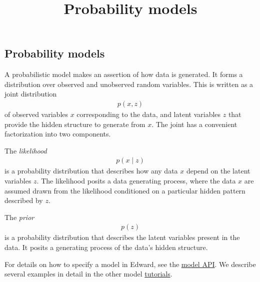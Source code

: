 \title{Probability models}

\subsection{Probability models}

A probabilistic model makes an assertion of how data is generated.
It forms a distribution over observed and unobserved random variables.
This is written as a joint distribution
\begin{align*}
  p(x, z)
\end{align*}
of observed variables $x$ corresponding to the data, and latent
variables $z$ that provide the hidden structure to generate from $x$.
The joint has a convenient factorization into two components.

The \emph{likelihood}
\begin{align*}
  p(x \mid z)
\end{align*}
is a probability distribution that describes how any data $x$ depend
on the latent variables $z$. The likelihood posits a data generating
process, where the data $x$ are assumed drawn from the likelihood
conditioned on a particular hidden pattern described by $z$.

The \emph{prior}
\begin{align*}
  p(z)
\end{align*}
is a probability distribution that describes the latent variables
present in the data. It posits a generating process of the
data's hidden structure.

For details on how to specify a model in Edward, see the
\href{api/models.html}{model API}. We describe several examples in detail
in the
other model \href{tutorials.html}{tutorials}.

